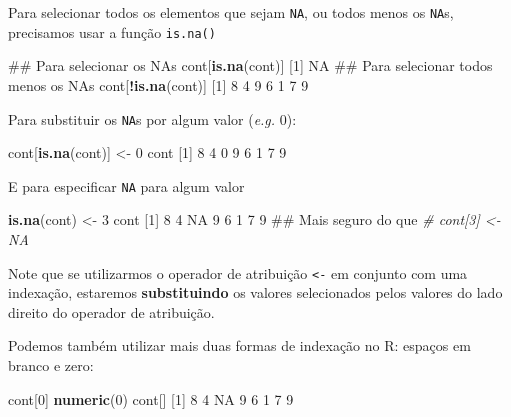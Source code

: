 \documentclass[10pt,a4paper]{book}
\newenvironment{Shaded}{\begin{snugshade}}{\end{snugshade}}
\newcommand{\KeywordTok}[1]{\textcolor[rgb]{0.13,0.29,0.53}{\textbf{#1}}}
\newcommand{\DecValTok}[1]{\textcolor[rgb]{0.00,0.00,0.81}{#1}}
\newcommand{\StringTok}[1]{\textcolor[rgb]{0.31,0.60,0.02}{#1}}
\newcommand{\CommentTok}[1]{\textcolor[rgb]{0.56,0.35,0.01}{\textit{#1}}}
\newcommand{\OtherTok}[1]{\textcolor[rgb]{0.56,0.35,0.01}{#1}}
\newcommand{\OperatorTok}[1]{\textcolor[rgb]{0.81,0.36,0.00}{\textbf{#1}}}
\newcommand{\NormalTok}[1]{#1}
\begin{document}
Para selecionar todos os elementos que sejam \texttt{NA}, ou todos menos
os \texttt{NA}s, precisamos usar a função \texttt{is.na()}

\begin{Shaded}
\begin{Highlighting}[]
\NormalTok{## Para selecionar os NAs}
\NormalTok{cont[}\KeywordTok{is.na}\NormalTok{(cont)]}
\NormalTok{[}\DecValTok{1}\NormalTok{] }\OtherTok{NA}
\NormalTok{## Para selecionar todos menos os NAs}
\NormalTok{cont[}\OperatorTok{!}\KeywordTok{is.na}\NormalTok{(cont)]}
\NormalTok{[}\DecValTok{1}\NormalTok{] }\DecValTok{8} \DecValTok{4} \DecValTok{9} \DecValTok{6} \DecValTok{1} \DecValTok{7} \DecValTok{9}
\end{Highlighting}
\end{Shaded}

Para substituir os \texttt{NA}s por algum valor (\emph{e.g.} 0):

\begin{Shaded}
\begin{Highlighting}[]
\NormalTok{cont[}\KeywordTok{is.na}\NormalTok{(cont)] <-}\StringTok{ }\DecValTok{0}
\NormalTok{cont}
\NormalTok{[}\DecValTok{1}\NormalTok{] }\DecValTok{8} \DecValTok{4} \DecValTok{0} \DecValTok{9} \DecValTok{6} \DecValTok{1} \DecValTok{7} \DecValTok{9}
\end{Highlighting}
\end{Shaded}

E para especificar \texttt{NA} para algum valor

\begin{Shaded}
\begin{Highlighting}[]
\KeywordTok{is.na}\NormalTok{(cont) <-}\StringTok{ }\DecValTok{3}
\NormalTok{cont}
\NormalTok{[}\DecValTok{1}\NormalTok{]  }\DecValTok{8}  \DecValTok{4} \OtherTok{NA}  \DecValTok{9}  \DecValTok{6}  \DecValTok{1}  \DecValTok{7}  \DecValTok{9}
\NormalTok{## Mais seguro do que}
\CommentTok{# cont[3] <- NA}
\end{Highlighting}
\end{Shaded}

Note que se utilizarmos o operador de atribuição \texttt{\textless{}-}
em conjunto com uma indexação, estaremos \textbf{substituindo} os
valores selecionados pelos valores do lado direito do operador de
atribuição.

Podemos também utilizar mais duas formas de indexação no R: espaços em
branco e zero:

\begin{Shaded}
\begin{Highlighting}[]
\NormalTok{cont[}\DecValTok{0}\NormalTok{]}
\KeywordTok{numeric}\NormalTok{(}\DecValTok{0}\NormalTok{)}
\NormalTok{cont[]}
\NormalTok{[}\DecValTok{1}\NormalTok{]  }\DecValTok{8}  \DecValTok{4} \OtherTok{NA}  \DecValTok{9}  \DecValTok{6}  \DecValTok{1}  \DecValTok{7}  \DecValTok{9}
\end{Highlighting}
\end{Shaded}
\end{document}
